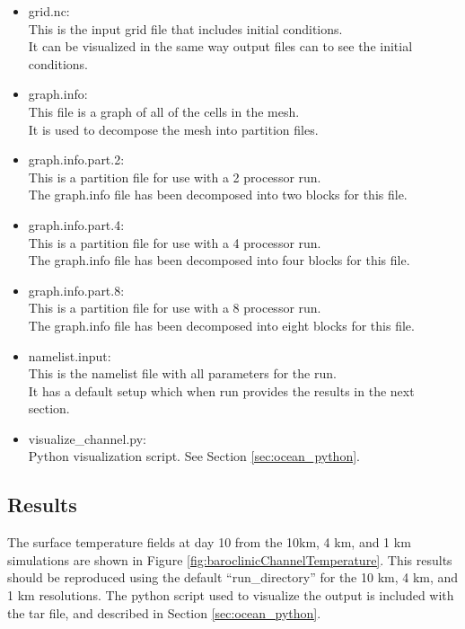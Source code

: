 \begin{itemize}
	\item grid.nc: \\
		This is the input grid file that includes initial conditions.  \\
		It can be visualized in the same way output files can to see the initial conditions.
	\item graph.info: \\
		This file is a graph of all of the cells in the mesh. \\
		It is used to decompose the mesh into partition files.
	\item graph.info.part.2: \\
		This is a partition file for use with a 2 processor run. \\
		The graph.info file has been decomposed into two blocks for this file.
	\item graph.info.part.4: \\
		This is a partition file for use with a 4 processor run. \\
		The graph.info file has been decomposed into four blocks for this file.
	\item graph.info.part.8: \\
		This is a partition file for use with a 8 processor run. \\
		The graph.info file has been decomposed into eight blocks for this file.
	\item namelist.input: \\
		This is the namelist file with all parameters for the run. \\
		It has a default setup which when run provides the results in the next section.
	\item visualize\_channel.py: \\
		Python visualization script.  See Section \ref{sec:ocean_python}.
\end{itemize}

\subsection{Results}
\label{subsecc:baroclinic_channel_results}
The surface temperature fields at day 10 from the 10km, 4 km, and 1 km simulations are shown in Figure \ref{fig:baroclinicChannelTemperature}.
This results should be reproduced using the default ``run\_directory'' for the 10 km, 4 km, and 1 km resolutions. The python script used to visualize the output is included with the tar file, and described in Section \ref{sec:ocean_python}.

